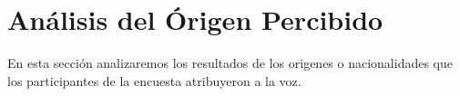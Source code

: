 





\clearpage
\section{Análisis del Órigen Percibido}

En esta sección analizaremos los resultados de los origenes o nacionalidades que los participantes de la encuesta atribuyeron a la voz.

